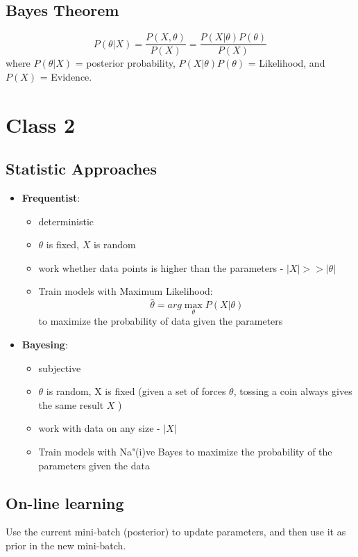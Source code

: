 \documentclass{article}
\begin{document}
\subsection{Bayes Theorem}

\begin{equation}	
	P(\theta|X) = \frac{P(X, \theta)}{P(X)} = \frac{P(X|\theta)P(\theta)}{P(X)}
\end{equation}
where $P(\theta|X)$ = posterior probability, $P(X|\theta)P(\theta)$ = Likelihood, and $P(X)$ = Evidence.

\section{Class 2}
\subsection{Statistic Approaches}
\begin{itemize}
    \item \textbf{Frequentist}: \begin{itemize}
        \item deterministic
		\item $\theta$ is fixed, $X$ is random
	    \item work whether data points is higher than the parameters - $|X| >> |\theta|$
		\item Train models with Maximum Likelihood: 
		\begin{equation}
		    \hat{\theta} = arg \max_\theta P(X|\theta)
		\end{equation}
	    to maximize the probability of data given the parameters
    \end{itemize}
    
    \item \textbf{Bayesing}: \begin{itemize}
        \item subjective
        \item $\theta$ is random, X is fixed (given a set of forces {$\theta$}, tossing a coin always gives the same result {$X$} )
		\item work with data on any size - $|X|$
		\item Train models with Na"(i)ve Bayes to maximize the probability of the parameters given the data
    \end{itemize}
\end{itemize}

			
\subsection{On-line learning}
Use the current mini-batch (posterior) to update parameters, and then use it as prior in the new mini-batch.
\end{document}
